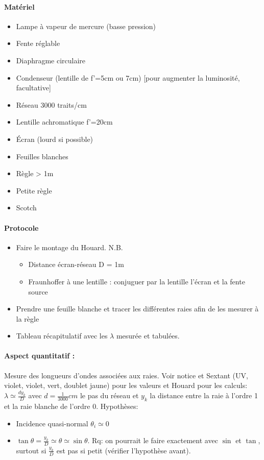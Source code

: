 \documentclass[11pt]{report}
\numberwithin{figure}{section}
\numberwithin{equation}{section}
\numberwithin{table}{section}
\newcommand{\1}{\boldsymbol{1}}
\begin{document}
\begin{tcolorbox}[breakable, enhanced, colback=red!2!white,colframe=mycolor!85!black,title=\textbf{\textbf{Expérience}}]
\paragraph*{Matériel}
\begin{itemize}
\item Lampe à vapeur de mercure (basse pression)
\item Fente réglable
\item Diaphragme circulaire
\item Condenseur (lentille de f'=5cm ou 7cm) [pour augmenter la luminosité, facultative]
\item Réseau 3000 traits/cm
\item Lentille achromatique f'=20cm
\item Écran (lourd si possible)
\item Feuilles blanches 
\item Règle > 1m
\item Petite règle
\item Scotch
\end{itemize}

\paragraph*{Protocole } 

\begin{itemize}[label=$\triangleright$]
		\item Faire le montage du Houard. N.B.
		\begin{itemize}
		\item Distance écran-réseau D = 1m
		\item Fraunhoffer à une lentille : conjuguer par la lentille l'écran et la fente source
		\end{itemize}
		\item Prendre une feuille blanche et tracer les différentes raies afin de les mesurer à la règle
		\item Tableau récapitulatif avec les $\lambda$ mesurée et tabulées.
\end{itemize}

\paragraph*{Aspect quantitatif :} Mesure des longueurs d'ondes associées aux raies. Voir notice et Sextant (UV, violet, violet, vert, doublet jaune) pour les valeurs et Houard pour les calculs: $\lambda \simeq \frac{d y_k}{D}$ avec $d = \frac{1}{3000} cm$ le pas du réseau et $y_k$ la distance entre la raie à l'ordre 1 et la raie blanche de l'ordre 0. Hypothèses:
\begin{itemize}
\item Incidence quasi-normal $\theta_ i \simeq 0$
\item $\tan \theta = \frac{y_k}{D} \simeq \theta  \simeq \sin \theta$. Rq: on pourrait le faire exactement avec $\sin$ et $\tan$, surtout si $\frac{y_k}{D}$ est pas si petit (vérifier l'hypothèse avant). 
\end{itemize}



\end{tcolorbox}
\end{document}
